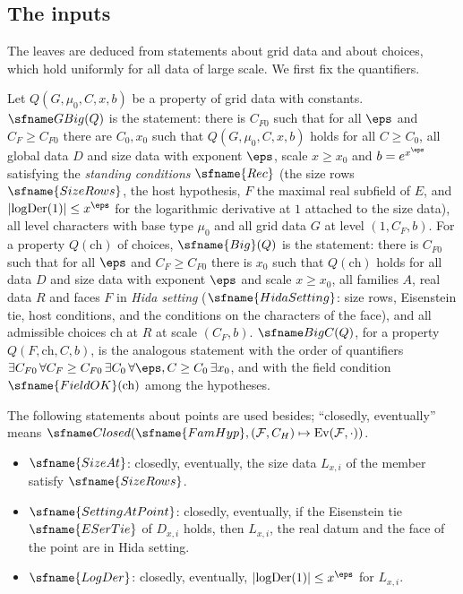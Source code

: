 \subsection{The inputs}\label{sec:pf:fit:inputs}

The leaves are deduced from statements about grid data and about choices, which hold uniformly for all data
of large scale. We first fix the quantifiers.

\begin{definition}\label{pf:fit:uniform}
Let $Q(G,\mu_0,C,x,b)$ be a property of grid data with constants. $\fitGBig(Q)$ is the statement: there is $C_{F0}$ such
that for all $\eps$ and $C_F\ge C_{F0}$ there are $C_0,x_0$ such that $Q(G,\mu_0,C,x,b)$ holds for all $C\ge C_0$, all
global data $D$ and size data with exponent $\eps$, scale $x\ge x_0$ and $b=e^{x^\eps}$ satisfying the \emph{standing
conditions} $\sfname{Rec}$ (the size rows $\sfname{SizeRows}$, the host hypothesis, $F$ the maximal real subfield of
$E$, and $|\mathrm{logDer}(1)|\le x^\eps$ for the logarithmic derivative at $1$ attached to the size data), all level
characters with base type $\mu_0$ and all grid data $G$ at level $(1,C_F,b)$. For a property $Q(\mathrm{ch})$ of choices,
$\sfname{Big}(Q)$ is the statement: there is $C_{F0}$ such that for all $\eps$ and $C_F\ge C_{F0}$ there is $x_0$ such
that $Q(\mathrm{ch})$ holds for all data $D$ and size data with exponent $\eps$ and scale $x\ge x_0$, all families $A$,
real data $R$ and faces $F$ in \emph{Hida setting} ($\sfname{HidaSetting}$: size rows, Eisenstein tie, host conditions,
and the conditions on the characters of the face), and all admissible choices $\mathrm{ch}$ at $R$ at scale $(C_F,b)$.
$\fitBigC(Q)$, for a property $Q(F,\mathrm{ch},C,b)$, is the analogous statement with the order of quantifiers
$\exists C_{F0}\,\forall C_F\ge C_{F0}\,\exists C_0\,\forall\eps,C\ge C_0\,\exists x_0$, and with the field condition
$\sfname{FieldOK}(\mathrm{ch})$ among the hypotheses.
\end{definition}

The following statements about points are used besides; ``closedly, eventually'' means
$\fitClosed(\sfname{FamHyp},(\mathcal F,C_H)\mapsto\fitEv(\mathcal F,\cdot))$.
\begin{itemize}
\item $\sfname{SizeAt}$: closedly, eventually, the size data $L_{x,i}$ of the member satisfy $\sfname{SizeRows}$.
\item $\sfname{SettingAtPoint}$: closedly, eventually, if the Eisenstein tie $\sfname{ESerTie}$ of $D_{x,i}$ holds, then
$L_{x,i}$, the real datum and the face of the point are in Hida setting.
\item $\sfname{LogDer}$: closedly, eventually, $|\mathrm{logDer}(1)|\le x^\eps$ for $L_{x,i}$.
\end{itemize}

